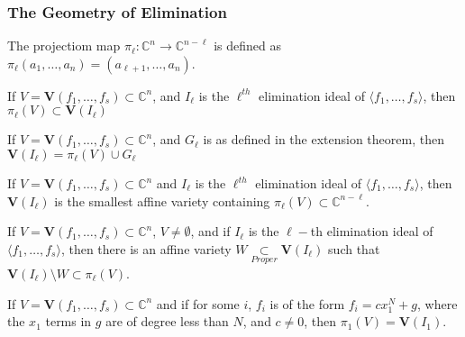 \documentclass[crop=false,class=book,oneside]{standalone}
\begin{document}
            \subsubsection{The Geometry of Elimination}
                \begin{definition}
                        The projectiom map
                        $\pi_{\ell}:\mathbb{C}^{n}\rightarrow\mathbb{C}^{n-\ell}$
                        is defined as
                        $\pi_{\ell}(a_{1},\hdots,a_{n})=(a_{\ell+1},\hdots,a_{n})$.
                \end{definition}
                \begin{theorem}
                        If $V=\mathbf{V}(f_{1},\hdots,f_{s})\subset\mathbb{C}^{n}$,
                        and $I_{\ell}$ is the $\ell^{th}$ elimination ideal of
                        $\langle{f_{1},\hdots,f_{s}}\rangle$,
                        then $\pi_{\ell}(V)\subset\textbf{V}(I_{\ell})$
                \end{theorem}
                \begin{theorem}
                        If $V=\mathbf{V}(f_{1},\hdots,f_{s})\subset\mathbb{C}^{n}$,
                        and $G_{\ell}$ is as defined in the extension theorem,
                        then $\textbf{V}(I_{\ell})=\pi_{\ell}(V)\cup{G_{\ell}}$
                \end{theorem}
                \begin{theorem}
                        If $V=\mathbf{V}(f_{1},\hdots,f_{s})\subset\mathbb{C}^{n}$
                        and $I_{\ell}$ is the $\ell^{th}$ elimination ideal of
                        $\langle{f_{1},\hdots,f_{s}}\rangle$, then
                        $\textbf{V}(I_{\ell})$ is the smallest affine variety
                        containing $\pi_{\ell}(V)\subset\mathbb{C}^{n-\ell}$.
                \end{theorem}
                \begin{theorem}
                If $V = \mathbf{V}(f_1,\hdots, f_s) \subset \mathbb{C}^n$, $V\ne \emptyset$, and if $I_{\ell}$ is the $\ell-$th elimination ideal of $\langle f_1,\hdots, f_s\rangle$, then there is an affine variety $W\underset{Proper}{\subset} \textbf{V}(I_{\ell})$ such that $\textbf{V}(I_{\ell})\setminus W \subset \pi_{\ell}(V)$.
                \end{theorem}
                \begin{theorem}
                If $V = \mathbf{V}(f_1,\hdots, f_s)\subset \mathbb{C}^n$ and if for some $i$, $f_i$ is of the form $f_i = cx_1^N + g$, where the $x_1$ terms in $g$ are of degree less than $N$, and $c\ne 0$, then $\pi_{1}(V) = \textbf{V}(I_{1})$.
                \end{theorem}
\end{document}
